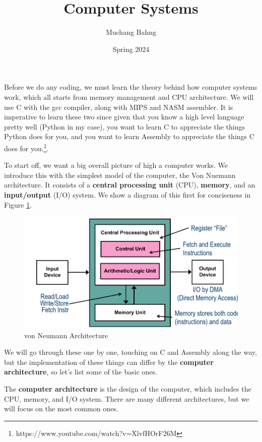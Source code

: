 \documentclass{article}
\begin{document}
\title{Computer Systems}
\author{Muchang Bahng}
\date{Spring 2024}

\maketitle
\tableofcontents
\pagebreak

Before we do any coding, we must learn the theory behind how computer systems work, which all starts from memory management and CPU architecture. We will use C with the gcc compiler, along with MIPS and NASM assembler. It is imperative to learn these two since given that you know a high level language pretty well (Python in my case), you want to learn C to appreciate the things Python does for you, and you want to learn Assembly to appreciate the things C does for you.\footnote{https://www.youtube.com/watch?v=XlvfHOrF26M}. 

To start off, we want a big overall picture of high a computer works. We introduce this with the simplest model of the computer, the Von Nuemann architecture. It consists of a \textbf{central processing unit} (CPU), \textbf{memory}, and an \textbf{input/output} (I/O) system. We show a diagram of this first for conciseness in Figure \ref{fig:von_neumann_arch}. 

\begin{figure}[H]
  \centering 
  \includegraphics[scale=0.4]{img/von_neumann_arch.png}
  \caption{von Neumann Architecture} 
  \label{fig:von_neumann_arch}
\end{figure}

We will go through these one by one, touching on C and Assembly along the way, but the implementation of these things can differ by the \textbf{computer architecture}, so let's list some of the basic ones. 

\begin{definition}
  The \textbf{computer architecture} is the design of the computer, which includes the CPU, memory, and I/O system. There are many different architectures, but we will focus on the most common ones.
\end{definition}
\end{document}

